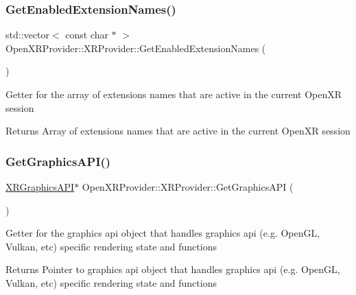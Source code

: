 \subsubsection{\texorpdfstring{GetEnabledExtensionNames()}{GetEnabledExtensionNames()}}
{\footnotesize\ttfamily std\+::vector$<$ const char $\ast$ $>$ Open\+X\+R\+Provider\+::\+X\+R\+Provider\+::\+Get\+Enabled\+Extension\+Names (\begin{DoxyParamCaption}{ }\end{DoxyParamCaption})\hspace{0.3cm}{\ttfamily [inline]}}

Getter for the array of extensions names that are active in the current Open\+XR session \begin{DoxyReturn}{Returns}
Array of extensions names that are active in the current Open\+XR session 
\end{DoxyReturn}
\mbox{\label{class_open_x_r_provider_1_1_x_r_provider_a1bd00e46e92f0b45945c7d92f9bde0b3}} 
\subsubsection{\texorpdfstring{GetGraphicsAPI()}{GetGraphicsAPI()}}
{\footnotesize\ttfamily \mbox{\hyperlink{class_open_x_r_provider_1_1_x_r_graphics_a_p_i}{X\+R\+Graphics\+A\+PI}}$\ast$ Open\+X\+R\+Provider\+::\+X\+R\+Provider\+::\+Get\+Graphics\+A\+PI (\begin{DoxyParamCaption}{ }\end{DoxyParamCaption})\hspace{0.3cm}{\ttfamily [inline]}}

Getter for the graphics api object that handles graphics api (e.\+g. Open\+GL, Vulkan, etc) specific rendering state and functions \begin{DoxyReturn}{Returns}
Pointer to graphics api object that handles graphics api (e.\+g. Open\+GL, Vulkan, etc) specific rendering state and functions 
\end{DoxyReturn}
\mbox{\label{class_open_x_r_provider_1_1_x_r_provider_a23806791a9dbc50aa1aaf4e3fcf53cc4}} 
